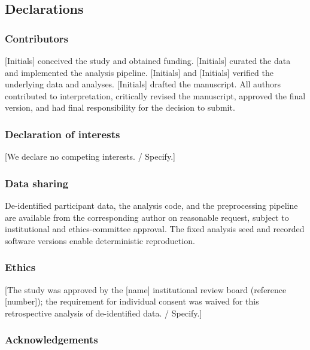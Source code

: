 \documentclass[
  english,
  11pt,
]{article}
\begin{document}
\subsection{Declarations}\label{declarations}

\subsubsection{Contributors}\label{contributors}

{[}Initials{]} conceived the study and obtained funding. {[}Initials{]}
curated the data and implemented the analysis pipeline. {[}Initials{]}
and {[}Initials{]} verified the underlying data and analyses.
{[}Initials{]} drafted the manuscript. All authors contributed to
interpretation, critically revised the manuscript, approved the final
version, and had final responsibility for the decision to submit.

\subsubsection{Declaration of interests}\label{declaration-of-interests}

{[}We declare no competing interests. / Specify.{]}

\subsubsection{Data sharing}\label{data-sharing}

De-identified participant data, the analysis code, and the preprocessing
pipeline are available from the corresponding author on reasonable
request, subject to institutional and ethics-committee approval. The
fixed analysis seed and recorded software versions enable deterministic
reproduction.

\subsubsection{Ethics}\label{ethics}

{[}The study was approved by the {[}name{]} institutional review board
(reference {[}number{]}); the requirement for individual consent was
waived for this retrospective analysis of de-identified data. /
Specify.{]}

\subsubsection{Acknowledgements}\label{acknowledgements}
\end{document}
